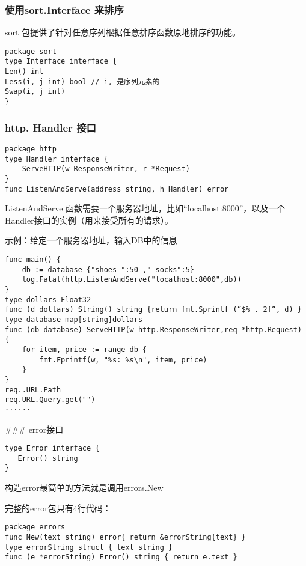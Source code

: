 \hypertarget{ux4f7fux7528sort.interface-ux6765ux6392ux5e8f}{%
\subsubsection{使用sort.Interface
来排序}\label{ux4f7fux7528sort.interface-ux6765ux6392ux5e8f}}

sort 包提供了针对任意序列根据任意排序函数原地排序的功能。

\begin{verbatim}
package sort
type Interface interface { 
Len() int 
Less(i, j int) bool // i, 是序列元素的
Swap(i, j int)
}
\end{verbatim}

\hypertarget{http.-handler-ux63a5ux53e3}{%
\subsubsection{http. Handler 接口}\label{http.-handler-ux63a5ux53e3}}

\begin{verbatim}
package http
type Handler interface {
    ServeHTTP(w ResponseWriter, r *Request)
}
func ListenAndServe(address string, h Handler) error
\end{verbatim}

ListenAndServe
函数需要一个服务器地址，比如``localhost:8000''，以及一个Handler接口的实例（用来接受所有的请求）。

示例：给定一个服务器地址，输入DB中的信息

\begin{verbatim}
func main() {
    db := database {"shoes ":50 ," socks":5}
    log.Fatal(http.ListenAndServe("localhost:8000",db))
}
type dollars Float32
func (d dollars) String() string {return fmt.Sprintf (”$% . 2f”, d) }
type database map[string]dollars
func (db database) ServeHTTP(w http.ResponseWriter,req *http.Request) { 
    for item, price := range db {
        fmt.Fprintf(w, "%s: %s\n", item, price)
    }
}
req..URL.Path
req.URL.Query.get("")
······
\end{verbatim}

\#\#\# error接口

\begin{verbatim}
type Error interface {
   Error() string
}
\end{verbatim}

构造error最简单的方法就是调用errors.New

完整的error包只有4行代码：

\begin{verbatim}
package errors
func New(text string) error{ return &errorString{text} }
type errorString struct { text string }
func (e *errorString) Error() string { return e.text }
\end{verbatim}

